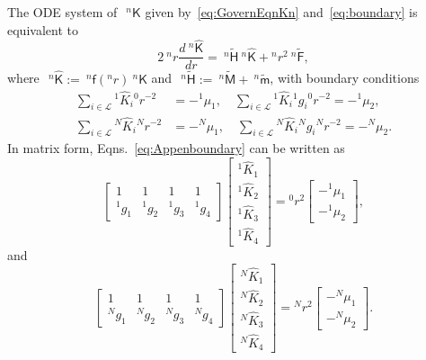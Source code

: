 \documentclass[preprint,10pt,times]{elsarticle}
\numberwithin{equation}{section}
\renewcommand{\u}[1]{\boldsymbol{#1}}
\newcommand{\usf}[1]{\u{\mathsf #1}}
\renewcommand{\>}{$\Rightarrow$}
\begin{document}
The ODE system of~$~^{n}{\usf{K}}$ given by~\eqref{eq:GovernEqnKn} and~\eqref{eq:boundary} is equivalent to
\begin{equation}
	2 ~^{n}\!{r} \frac{d~^{n}{\hat{\usf{K}}}}{dr} = ~^{n}\tilde{\usf{H}} ~^{n}{\hat{\usf{K}}} + {}^{n}\!r^2 ~^{n}\tilde{\usf{F}},
	\label{eq:AppendKendr}
\end{equation}
where~$~^{n}{\hat{\usf{K}}} := ~^{n}\usf{f}({}^{n}\!r)~^{n}{\usf{K}}$ and~$~^{n}\tilde{\usf{H}} := ~^{n}\tilde{\usf{M}} + ~^{n}\tilde{\usf{m}}$, with boundary conditions
\begin{subequations}
	\begin{align}
	\sum_{i \in \mathcal{L}} {}^{1}\!\hat{K}_{i} {}^{0}\!{r}^{-2} & = -{}^{1}\!{\mu_{1}}, \quad
	 \sum_{i \in \mathcal{L}} {}^{1}\!\hat{K}_{i} {}^{1}\!{g_{i}} {}^{0}\!{r}^{-2} = -{}^{1}\!{\mu_{2}},\\
	\sum_{i \in \mathcal{L}} {}^{N}\!\hat{K}_{i} {}^{N}\!{r}^{-2} & = -{}^{N}\!{\mu_{1}}, \quad
	 \sum_{i \in \mathcal{L}} {}^{N}\!\hat{K}_{i} {}^{N}\!{g_{i}} {}^{N}\!{r}^{-2} = -{}^{N}\!{\mu_{2}}.
	\end{align}
	\label{eq:Appenboundary}
\end{subequations}
In matrix form, Eqns.~\eqref{eq:Appenboundary} can be written as
\begin{equation}
  \begin{bmatrix}
  1 & 1 & 1 & 1 \\
  {}^{1}\!g_1 & {}^{1}\!g_2 & {}^{1}\!g_3 & {}^{1}\!g_4
  \end{bmatrix}
  \begin{bmatrix}
  {}^{1}\!{\hat{K}_{1}} \\ {}^{1}\!{\hat{K}_{2}} \\{}^{1}\!{\hat{K}_{3}} \\{}^{1}\!{\hat{K}_{4}}
  \end{bmatrix}
  = {}^{0}\!{r}^{2}
  \begin{bmatrix}
  -{}^{1}\!{\mu_{1}} \\ -{}^{1}\!{\mu_{2}}
  \end{bmatrix},
\end{equation}
and
\begin{equation}
  \begin{bmatrix}
  1 & 1 & 1 & 1 \\
  {}^{N}\!g_1 & {}^{N}\!g_2 & {}^{N}\!g_3 & {}^{N}\!g_4
  \end{bmatrix}
  \begin{bmatrix}
  {}^{N}\!{\hat{K}_{1}} \\ {}^{N}\!{\hat{K}_{2}} \\{}^{N}\!{\hat{K}_{3}} \\{}^{N}\!{\hat{K}_{4}}
  \end{bmatrix}
  = {}^{N}\!{r}^{2}
  \begin{bmatrix}
  -{}^{N}\!{\mu_{1}} \\ -{}^{N}\!{\mu_{2}}
  \end{bmatrix}.
\end{equation}
\end{document}

